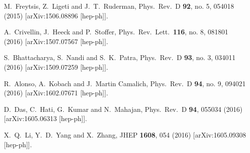 \documentclass[prd,preprint,superscriptaddress,amsmath,amssymb]{revtex4}
\begin{document}
\begin{thebibliography}{100}
  M.~Freytsis, Z.~Ligeti and J.~T.~Ruderman,
  Phys.\ Rev.\ D {\bf 92}, no. 5, 054018 (2015)
  [arXiv:1506.08896 [hep-ph]].
 
  A.~Crivellin, J.~Heeck and P.~Stoffer,
  Phys.\ Rev.\ Lett.\  {\bf 116}, no. 8, 081801 (2016)
  [arXiv:1507.07567 [hep-ph]].

  S.~Bhattacharya, S.~Nandi and S.~K.~Patra,
  Phys.\ Rev.\ D {\bf 93}, no. 3, 034011 (2016)
  [arXiv:1509.07259 [hep-ph]].
  
  R.~Alonso, A.~Kobach and J.~Martin Camalich,
  Phys.\ Rev.\ D {\bf 94}, no. 9, 094021 (2016)
  [arXiv:1602.07671 [hep-ph]].

  
  D.~Das, C.~Hati, G.~Kumar and N.~Mahajan,
  Phys.\ Rev.\ D {\bf 94}, 055034 (2016)
  [arXiv:1605.06313 [hep-ph]].
  
  X.~Q.~Li, Y.~D.~Yang and X.~Zhang,
  JHEP {\bf 1608}, 054 (2016)
  [arXiv:1605.09308 [hep-ph]].
  

\end{thebibliography}
\end{document}
